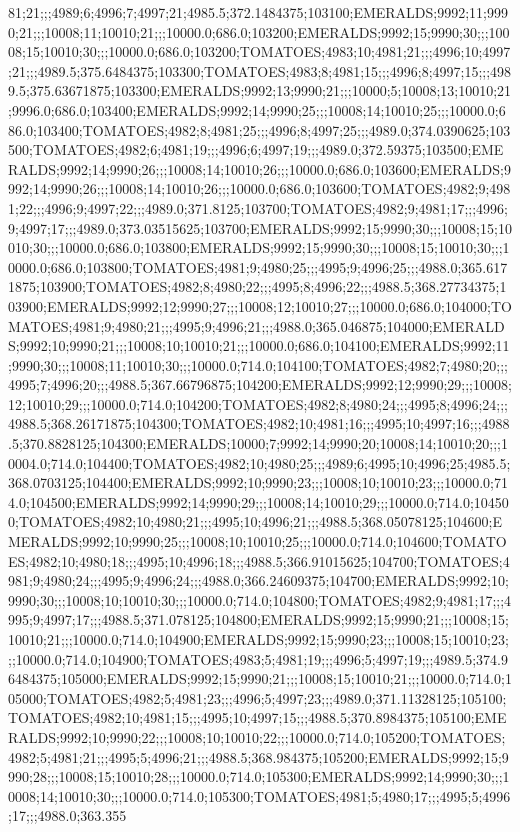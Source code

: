 81;21;;;4989;6;4996;7;4997;21;4985.5;372.1484375;103100;EMERALDS;9992;11;9990;21;;;10008;11;10010;21;;;10000.0;686.0;103200;EMERALDS;9992;15;9990;30;;;10008;15;10010;30;;;10000.0;686.0;103200;TOMATOES;4983;10;4981;21;;;4996;10;4997;21;;;4989.5;375.6484375;103300;TOMATOES;4983;8;4981;15;;;4996;8;4997;15;;;4989.5;375.63671875;103300;EMERALDS;9992;13;9990;21;;;10000;5;10008;13;10010;21;9996.0;686.0;103400;EMERALDS;9992;14;9990;25;;;10008;14;10010;25;;;10000.0;686.0;103400;TOMATOES;4982;8;4981;25;;;4996;8;4997;25;;;4989.0;374.0390625;103500;TOMATOES;4982;6;4981;19;;;4996;6;4997;19;;;4989.0;372.59375;103500;EMERALDS;9992;14;9990;26;;;10008;14;10010;26;;;10000.0;686.0;103600;EMERALDS;9992;14;9990;26;;;10008;14;10010;26;;;10000.0;686.0;103600;TOMATOES;4982;9;4981;22;;;4996;9;4997;22;;;4989.0;371.8125;103700;TOMATOES;4982;9;4981;17;;;4996;9;4997;17;;;4989.0;373.03515625;103700;EMERALDS;9992;15;9990;30;;;10008;15;10010;30;;;10000.0;686.0;103800;EMERALDS;9992;15;9990;30;;;10008;15;10010;30;;;10000.0;686.0;103800;TOMATOES;4981;9;4980;25;;;4995;9;4996;25;;;4988.0;365.6171875;103900;TOMATOES;4982;8;4980;22;;;4995;8;4996;22;;;4988.5;368.27734375;103900;EMERALDS;9992;12;9990;27;;;10008;12;10010;27;;;10000.0;686.0;104000;TOMATOES;4981;9;4980;21;;;4995;9;4996;21;;;4988.0;365.046875;104000;EMERALDS;9992;10;9990;21;;;10008;10;10010;21;;;10000.0;686.0;104100;EMERALDS;9992;11;9990;30;;;10008;11;10010;30;;;10000.0;714.0;104100;TOMATOES;4982;7;4980;20;;;4995;7;4996;20;;;4988.5;367.66796875;104200;EMERALDS;9992;12;9990;29;;;10008;12;10010;29;;;10000.0;714.0;104200;TOMATOES;4982;8;4980;24;;;4995;8;4996;24;;;4988.5;368.26171875;104300;TOMATOES;4982;10;4981;16;;;4995;10;4997;16;;;4988.5;370.8828125;104300;EMERALDS;10000;7;9992;14;9990;20;10008;14;10010;20;;;10004.0;714.0;104400;TOMATOES;4982;10;4980;25;;;4989;6;4995;10;4996;25;4985.5;368.0703125;104400;EMERALDS;9992;10;9990;23;;;10008;10;10010;23;;;10000.0;714.0;104500;EMERALDS;9992;14;9990;29;;;10008;14;10010;29;;;10000.0;714.0;104500;TOMATOES;4982;10;4980;21;;;4995;10;4996;21;;;4988.5;368.05078125;104600;EMERALDS;9992;10;9990;25;;;10008;10;10010;25;;;10000.0;714.0;104600;TOMATOES;4982;10;4980;18;;;4995;10;4996;18;;;4988.5;366.91015625;104700;TOMATOES;4981;9;4980;24;;;4995;9;4996;24;;;4988.0;366.24609375;104700;EMERALDS;9992;10;9990;30;;;10008;10;10010;30;;;10000.0;714.0;104800;TOMATOES;4982;9;4981;17;;;4995;9;4997;17;;;4988.5;371.078125;104800;EMERALDS;9992;15;9990;21;;;10008;15;10010;21;;;10000.0;714.0;104900;EMERALDS;9992;15;9990;23;;;10008;15;10010;23;;;10000.0;714.0;104900;TOMATOES;4983;5;4981;19;;;4996;5;4997;19;;;4989.5;374.96484375;105000;EMERALDS;9992;15;9990;21;;;10008;15;10010;21;;;10000.0;714.0;105000;TOMATOES;4982;5;4981;23;;;4996;5;4997;23;;;4989.0;371.11328125;105100;TOMATOES;4982;10;4981;15;;;4995;10;4997;15;;;4988.5;370.8984375;105100;EMERALDS;9992;10;9990;22;;;10008;10;10010;22;;;10000.0;714.0;105200;TOMATOES;4982;5;4981;21;;;4995;5;4996;21;;;4988.5;368.984375;105200;EMERALDS;9992;15;9990;28;;;10008;15;10010;28;;;10000.0;714.0;105300;EMERALDS;9992;14;9990;30;;;10008;14;10010;30;;;10000.0;714.0;105300;TOMATOES;4981;5;4980;17;;;4995;5;4996;17;;;4988.0;363.355